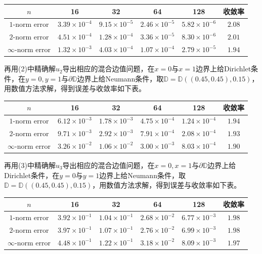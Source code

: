 \documentclass[lang=cn,11pt,a4paper]{elegantpaper}
\begin{document}
\begin{table}[H]
  \centering
  \begin{tabular}{c|cccc|c}
  \textbf{$n$}        & 16                   & 32                   & 64                   & 128                  & 收敛率 \\ \hline
  $1$-norm error      & $3.39\times 10^{-4}$ & $9.15\times 10^{-5}$ & $2.46\times 10^{-5}$ & $5.82\times 10^{-6}$ & $2.08$\\
  $2$-norm error      & $4.51\times 10^{-4}$ & $1.28\times 10^{-4}$ & $3.36\times 10^{-5}$ & $8.30\times 10^{-6}$ & $2.01$\\
  $\infty$-norm error & $1.32\times 10^{-3}$ & $4.03\times 10^{-4}$ & $1.07\times 10^{-4}$ & $2.79\times 10^{-5}$ & $1.94$
  \end{tabular}
\end{table}

再用(2)中精确解$u_2$导出相应的混合边值问题，在$x=0$与$x=1$边界上给Dirichlet条件，在$y=0,y=1$与$\partial \mathbb{D}$边界上给Neumann条件，取$\mathbb{D}=\mathbb{D}((0.45,0.45),0.15)$，用数值方法求解，得到误差与收敛率如下表。

\begin{table}[H]
  \centering
  \begin{tabular}{c|cccc|c}
  \textbf{$n$}        & 16                   & 32                   & 64                   & 128                  & 收敛率 \\ \hline
  $1$-norm error      & $6.12\times 10^{-3}$ & $1.78\times 10^{-3}$ & $4.75\times 10^{-4}$ & $1.24\times 10^{-4}$ & $1.94$\\
  $2$-norm error      & $9.71\times 10^{-3}$ & $2.92\times 10^{-3}$ & $7.91\times 10^{-4}$ & $2.08\times 10^{-4}$ & $1.93$\\
  $\infty$-norm error & $3.26\times 10^{-2}$ & $1.06\times 10^{-2}$ & $3.00\times 10^{-3}$ & $8.03\times 10^{-4}$ & $1.90$
  \end{tabular}
\end{table}

再用(3)中精确解$u_3$导出相应的混合边值问题，在$x=0,x=1$与$\partial \mathbb{D}$边界上给Dirichlet条件，在$y=0$与$y=1$边界上给Neumann条件，取$\mathbb{D}=\mathbb{D}((0.45,0.45),0.15)$，用数值方法求解，得到误差与收敛率如下表。

\begin{table}[H]
  \centering
  \begin{tabular}{c|cccc|c}
  \textbf{$n$}        & 16                   & 32                   & 64                   & 128                  & 收敛率 \\ \hline
  $1$-norm error      & $3.92\times 10^{-1}$ & $1.04\times 10^{-1}$ & $2.68\times 10^{-2}$ & $6.77\times 10^{-3}$ & $1.98$\\
  $2$-norm error      & $3.97\times 10^{-1}$ & $1.07\times 10^{-1}$ & $2.76\times 10^{-2}$ & $6.99\times 10^{-3}$ & $1.98$\\
  $\infty$-norm error & $4.48\times 10^{-1}$ & $1.22\times 10^{-1}$ & $3.18\times 10^{-2}$ & $8.09\times 10^{-3}$ & $1.97$
  \end{tabular}
\end{table}
\end{document}
